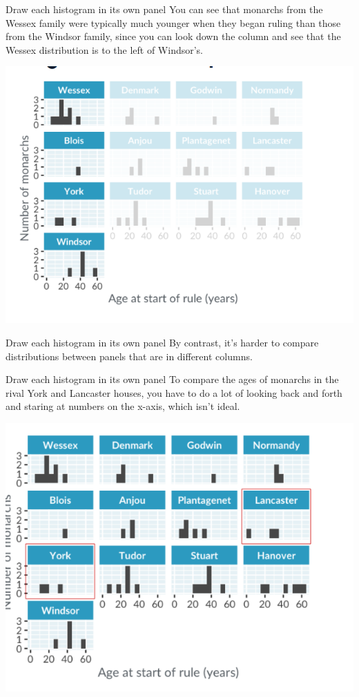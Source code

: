 \documentclass[
  ignorenonframetext,
]{beamer}
\begin{document}
\begin{frame}{Draw each histogram in its own panel}
\label{draw-each-histogram-in-its-own-panel-2}
You can see that monarchs from the Wessex family were typically much
younger when they began ruling than those from the Windsor family, since
you can look down the column and see that the Wessex distribution is to
the left of Windsor's.

\includegraphics{../images/im19.png}
\end{frame}

\begin{frame}{Draw each histogram in its own panel}
\label{draw-each-histogram-in-its-own-panel-3}
By contrast, it's harder to compare distributions between panels that
are in different columns.
\end{frame}

\begin{frame}{Draw each histogram in its own panel}
\label{draw-each-histogram-in-its-own-panel-4}
To compare the ages of monarchs in the rival York and Lancaster houses,
you have to do a lot of looking back and forth and staring at numbers on
the x-axis, which isn't ideal.

\includegraphics{../images/im20.png}
\end{frame}
\end{document}
